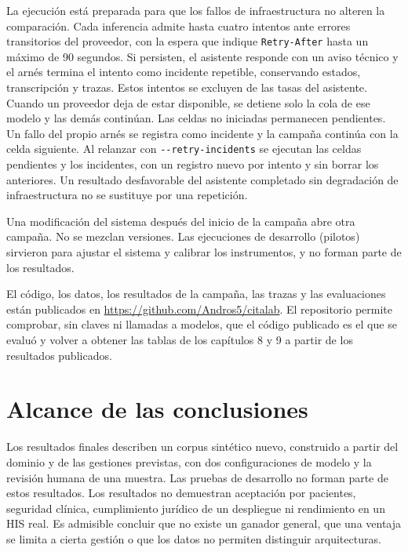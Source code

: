 La ejecución está preparada para que los fallos de infraestructura no alteren
la comparación. Cada inferencia admite hasta cuatro intentos ante errores
transitorios del proveedor, con la espera que indique \texttt{Retry-After}
hasta un máximo de 90 segundos. Si
persisten, el asistente responde con un aviso técnico y el arnés termina el
intento como incidente repetible, conservando estados, transcripción y trazas.
Estos intentos se excluyen de las tasas del asistente. Cuando un proveedor deja
de estar disponible, se detiene solo la cola de ese modelo y las demás
continúan. Las celdas no iniciadas permanecen pendientes. Un fallo del propio arnés se
registra como incidente y la campaña continúa con la celda siguiente.
Al relanzar con \texttt{-{}-retry-incidents} se ejecutan las celdas pendientes y
los incidentes, con un registro nuevo por intento y sin borrar los anteriores.
Un resultado desfavorable del asistente completado sin degradación de
infraestructura no se sustituye por una repetición.

Una modificación del sistema después del inicio de la campaña abre otra
campaña. No se mezclan versiones. Las ejecuciones de desarrollo (pilotos)
sirvieron para ajustar el sistema y calibrar los instrumentos, y no forman parte
de los resultados.

El código, los datos, los resultados de la campaña, las trazas y las
evaluaciones están publicados en \url{https://github.com/Andros5/citalab}. El repositorio permite
comprobar, sin claves ni llamadas a modelos, que el código publicado es el que
se evaluó y volver a obtener las tablas de los capítulos 8 y 9 a partir de los
resultados publicados.

\section{Alcance de las conclusiones}

Los resultados finales describen un corpus sintético nuevo, construido a partir
del dominio y de las gestiones previstas, con dos configuraciones de modelo y
la revisión humana de una muestra. Las pruebas de desarrollo no forman parte de
estos resultados. Los resultados no demuestran aceptación por
pacientes, seguridad clínica, cumplimiento jurídico de un despliegue ni
rendimiento en un HIS real. Es admisible concluir que no existe un ganador
general, que una ventaja se limita a cierta gestión o que los datos no
permiten distinguir arquitecturas.

